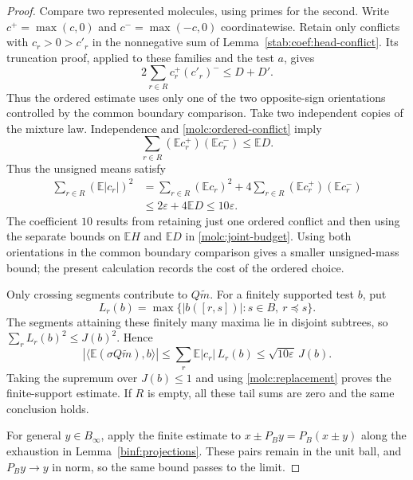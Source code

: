 \begin{proof}
Compare two represented molecules, using primes for the second.
Write $c^+=\max(c,0)$ and $c^-=\max(-c,0)$ coordinatewise.
Retain only conflicts with $c_r>0>c'_r$ in the nonnegative sum of
Lemma~\ref{stab:coef:head-conflict}. Its truncation proof, applied to
these families and the test $a$, gives
\begin{equation}\label{molc:ordered-conflict}
 2\sum_{r\in R}c_r^+(c'_r)^-\le D+D'.
\end{equation}
Thus the ordered estimate uses only one of the two opposite-sign
orientations controlled by the common boundary comparison.
Take two independent copies of the mixture law. Independence and
\eqref{molc:ordered-conflict} imply
\[
 \sum_{r\in R}(\mathbb Ec_r^+)(\mathbb Ec_r^-)
 \le\mathbb ED.
\]
Thus the unsigned means satisfy
\begin{equation}\label{molc:ten-deficit}
 \begin{aligned}
 \sum_{r\in R}(\mathbb E|c_r|)^2
 &=\sum_{r\in R}(\mathbb Ec_r)^2
     +4\sum_{r\in R}(\mathbb Ec_r^+)(\mathbb Ec_r^-)\\
 &\le 2\varepsilon+4\mathbb ED\le10\varepsilon.
 \end{aligned}
\end{equation}
The coefficient $10$ results from retaining just one ordered conflict
and then using the separate bounds on $\mathbb EH$ and $\mathbb ED$
in \eqref{molc:joint-budget}. Using both orientations in the common
boundary comparison gives a smaller unsigned-mass bound; the present
calculation records the cost of the ordered choice.

Only crossing segments contribute to $Q\widetilde m$. For a finitely
supported test $b$, put
\[
 L_r(b)=\max\{|b([r,s])|:s\in B,\ r\preceq s\}.
\]
The segments attaining these finitely many maxima lie in disjoint
subtrees, so $\sum_r L_r(b)^2\le J(b)^2$. Hence
\[
 |\langle\mathbb E(\sigma Q\widetilde m),b\rangle|
 \le\sum_r\mathbb E|c_r|\,L_r(b)
 \le\sqrt{10\varepsilon}\,J(b).
\]
Taking the supremum over $J(b)\le1$ and using
\eqref{molc:replacement} proves the finite-support estimate. If $R$ is
empty, all these tail sums are zero and the same conclusion holds.

For general $y\in B_\infty$, apply the finite estimate to
$x\pm P_By=P_B(x\pm y)$ along the exhaustion in
Lemma~\ref{binf:projections}. These pairs remain in the unit ball, and
$P_By\to y$ in norm, so the same bound passes to the limit.
\end{proof}

